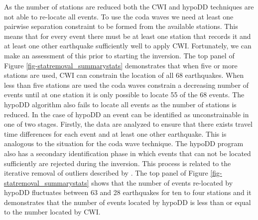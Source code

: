 \documentclass[extra, onecolumn, doublespacing]{gji}
\begin{document}
As the number of stations are reduced both the CWI and hypoDD
techniques are not able to re-locate all events. To use the coda
waves we need at least one pairwise separation constraint to be
formed from the available stations. This means that for every event
there must be at least one station that records it and at least one
other earthquake sufficiently well to apply CWI. Fortunately, we can
make an assessment of this prior to starting the inversion. The top
panel of Figure \ref{fig-statremoval_summarystats} demonstrates that
when five or more stations are used, CWI can constrain the location
of all 68 earthquakes. When less than five stations are used the
coda waves constrain a decreasing number of events until at one
station it is only possible to locate 55 of the 68 events. The
hypoDD algorithm also fails to locate all events as the number of
stations is reduced. In the case of hypoDD an event can be
identified as unconstrainable in one of two stages. Firstly, the
data are analyzed to ensure that there exists travel time
differences for each event and at least one other earthquake. This
is analogous to the situation for the coda wave technique. The
hypoDD program also has a secondary identification phase in which
events that can not be located sufficiently are rejected during the
inversion. This process is related to the iterative removal of
outliers described by \citet{dr_Waldhauser00a}. The top panel of
Figure \ref{fig-statremoval_summarystats} shows that the number of
events re-located by hypoDD fluctuates between 63 and 28 earthquakes
for ten to four stations and it demonstrates that the number of
events located by hypoDD is less than or equal to the number located
by CWI.

\end{document}
